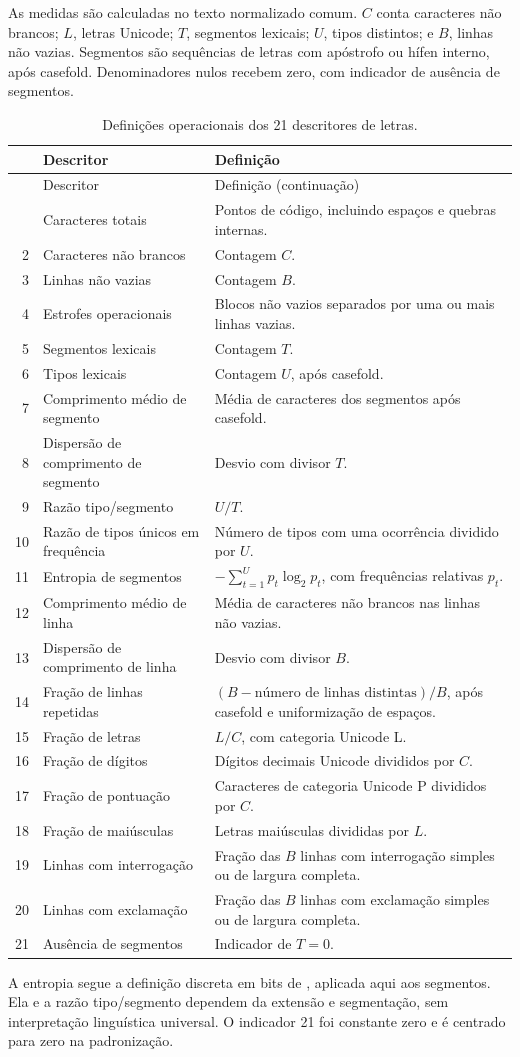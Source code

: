 As medidas são calculadas no texto normalizado comum. $C$ conta caracteres não brancos; $L$, letras Unicode; $T$, segmentos lexicais; $U$, tipos distintos; e $B$, linhas não vazias. Segmentos são sequências de letras com apóstrofo ou hífen interno, após casefold. Denominadores nulos recebem zero, com indicador de ausência de segmentos.

\begingroup\footnotesize\singlespacing
\begin{longtable}{rP{.31\linewidth}P{.56\linewidth}}
\caption{Definições operacionais dos 21 descritores de letras.}\label{tab:descritores}\\
\toprule & Descritor & Definição \\\midrule\endfirsthead
\toprule & Descritor & Definição (continuação) \\\midrule\endhead
\bottomrule{} & Caracteres totais & Pontos de código, incluindo espaços e quebras internas.\\
2 & Caracteres não brancos & Contagem $C$.\\
3 & Linhas não vazias & Contagem $B$.\\
4 & Estrofes operacionais & Blocos não vazios separados por uma ou mais linhas vazias.\\
5 & Segmentos lexicais & Contagem $T$.\\
6 & Tipos lexicais & Contagem $U$, após casefold.\\
7 & Comprimento médio de segmento & Média de caracteres dos segmentos após casefold.\\
8 & Dispersão de comprimento de segmento & Desvio com divisor $T$.\\
9 & Razão tipo/segmento & $U/T$.\\
10 & Razão de tipos únicos em frequência & Número de tipos com uma ocorrência dividido por $U$.\\
11 & Entropia de segmentos & $-\sum_{t=1}^{U}p_t\log_2p_t$, com frequências relativas $p_t$.\\
12 & Comprimento médio de linha & Média de caracteres não brancos nas linhas não vazias.\\
13 & Dispersão de comprimento de linha & Desvio com divisor $B$.\\
14 & Fração de linhas repetidas & $(B-\text{número de linhas distintas})/B$, após casefold e uniformização de espaços.\\
15 & Fração de letras & $L/C$, com categoria Unicode L.\\
16 & Fração de dígitos & Dígitos decimais Unicode divididos por $C$.\\
17 & Fração de pontuação & Caracteres de categoria Unicode P divididos por $C$.\\
18 & Fração de maiúsculas & Letras maiúsculas divididas por $L$.\\
19 & Linhas com interrogação & Fração das $B$ linhas com interrogação simples ou de largura completa.\\
20 & Linhas com exclamação & Fração das $B$ linhas com exclamação simples ou de largura completa.\\
21 & Ausência de segmentos & Indicador de $T=0$.\\
\end{longtable}
\endgroup

A entropia segue a definição discreta em bits de , aplicada aqui aos segmentos. Ela e a razão tipo/segmento dependem da extensão e segmentação, sem interpretação linguística universal. O indicador 21 foi constante zero e é centrado para zero na padronização.
